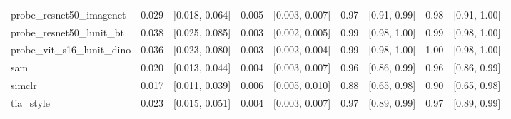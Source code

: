 \begin{tabular}{lrrrrrrrr}
probe\_resnet50\_imagenet & 0.029 & [0.018, 0.064] & 0.005 & [0.003, 0.007] & 0.97 & [0.91, 0.99] & 0.98 & [0.91, 1.00] \\
probe\_resnet50\_lunit\_bt & 0.038 & [0.025, 0.085] & 0.003 & [0.002, 0.005] & 0.99 & [0.98, 1.00] & 0.99 & [0.98, 1.00] \\
probe\_vit\_s16\_lunit\_dino & 0.036 & [0.023, 0.080] & 0.003 & [0.002, 0.004] & 0.99 & [0.98, 1.00] & 1.00 & [0.98, 1.00] \\
sam & 0.020 & [0.013, 0.044] & 0.004 & [0.003, 0.007] & 0.96 & [0.86, 0.99] & 0.96 & [0.86, 0.99] \\
simclr & 0.017 & [0.011, 0.039] & 0.006 & [0.005, 0.010] & 0.88 & [0.65, 0.98] & 0.90 & [0.65, 0.98] \\
tia\_style & 0.023 & [0.015, 0.051] & 0.004 & [0.003, 0.007] & 0.97 & [0.89, 0.99] & 0.97 & [0.89, 0.99] \\
\bottomrule
\end{tabular}
